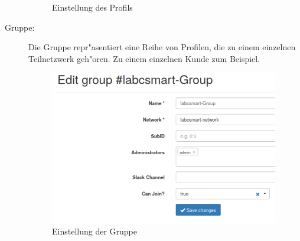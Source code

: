 \begin{description}
	\begin{figure}[h!]
		\centering
		\caption{Einstellung des Profils}
	\end{figure}
	\vspace{10cm}
	\item[Gruppe:] Die Gruppe repr"asentiert eine Reihe von Profilen, die zu einem einzelnen Teilnetzwerk geh"oren. Zu einem einzelnen Kunde zum Beispiel.
	\begin{figure}[h]
		\centering
		\includegraphics[width=10cm]{source/images/Labcsmart_group}
		\caption{Einstellung der Gruppe\label{fig:group}}
	\end{figure}
\end{description}

